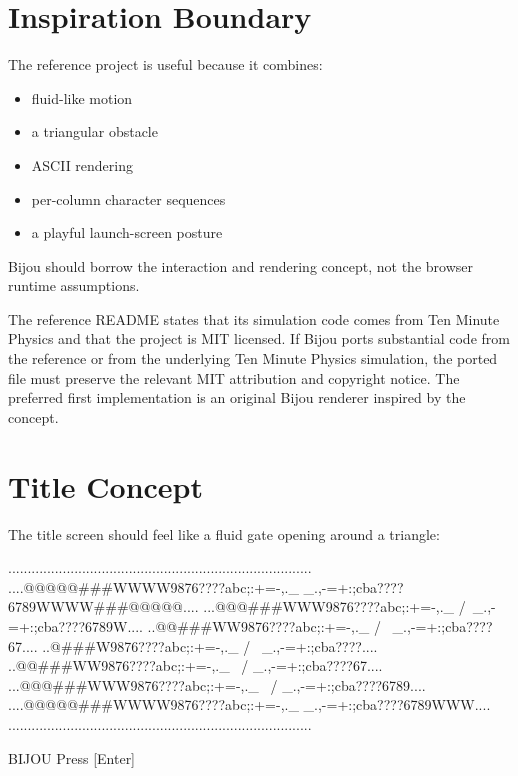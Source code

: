 \section{Inspiration Boundary}\label{record-114-inspiration-boundary}

The reference project is useful because it combines:

\begin{itemize}
\tightlist
\item
  fluid-like motion
\item
  a triangular obstacle
\item
  ASCII rendering
\item
  per-column character sequences
\item
  a playful launch-screen posture
\end{itemize}

Bijou should borrow the interaction and rendering concept, not the browser runtime assumptions.

The reference README states that its simulation code comes from Ten Minute Physics and that the project is MIT licensed. If Bijou ports substantial code from the reference or from the underlying Ten Minute Physics simulation, the ported file must preserve the relevant MIT attribution and copyright notice. The preferred first implementation is an original Bijou renderer inspired by the concept.

\section{Title Concept}\label{record-114-title-concept}

The title screen should feel like a fluid gate opening around a triangle:

\begin{CodeBlock}
..............................................................................
....@@@@@###WWWW9876????abc;:+=-,._       _.,-=+:;cba????6789WWWW###@@@@@....
...@@@###WWW9876????abc;:+=-,._          /\          _.,-=+:;cba????6789W....
..@@###WW9876????abc;:+=-,._            /  \            _.,-=+:;cba????67....
..@###W9876????abc;:+=-,._             /    \             _.,-=+:;cba????....
..@@###WW9876????abc;:+=-,._           \    /           _.,-=+:;cba????67....
...@@@###WWW9876????abc;:+=-,._         \  /         _.,-=+:;cba????6789....
....@@@@@###WWWW9876????abc;:+=-,._      \/      _.,-=+:;cba????6789WWW....
..............................................................................

                                  BIJOU
                              Press [Enter]
\end{CodeBlock}


